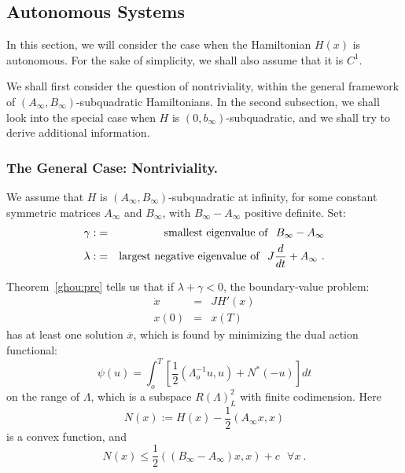 \documentclass{llncs}
\begin{document}
    \subsection{Autonomous Systems}
    In this section, we will consider the case when the Hamiltonian $H(x)$
    is autonomous. For the sake of simplicity, we shall also assume that it
    is $C^{1}$.
    
    We shall first consider the question of nontriviality, within the
    general framework of
    $\left(A_{\infty},B_{\infty}\right)$-subquadratic Hamiltonians. In
    the second subsection, we shall look into the special case when $H$ is
    $\left(0,b_{\infty}\right)$-subquadratic,
    and we shall try to derive additional information.
    \subsubsection{The General Case: Nontriviality.}
    We assume that $H$ is
    $\left(A_{\infty},B_{\infty}\right)$-sub\-qua\-dra\-tic at infinity,
    for some constant symmetric matrices $A_{\infty}$ and $B_{\infty}$,
    with $B_{\infty}-A_{\infty}$ positive definite. Set:
    \begin{eqnarray}
    \gamma :&=&{\rm smallest\ eigenvalue\ of}\ \ B_{\infty} - A_{\infty} \\
      \lambda : &=& {\rm largest\ negative\ eigenvalue\ of}\ \
      J \frac{d}{dt} +A_{\infty}\ .
    \end{eqnarray}
    
    Theorem~\ref{ghou:pre} tells us that if $\lambda +\gamma < 0$, the
    boundary-value problem:
    \begin{equation}
    \begin{array}{rcl}
      \dot{x}&=&JH' (x)\\
      x(0)&=&x (T)
    \end{array}
    \end{equation}
    has at least one solution
    $\overline{x}$, which is found by minimizing the dual
    action functional:
    \begin{equation}
      \psi (u) = \int_{o}^{T} \left[\frac{1}{2}
      \left(\Lambda_{o}^{-1} u,u\right) + N^{\ast} (-u)\right] dt
    \end{equation}
    on the range of $\Lambda$, which is a subspace $R (\Lambda)_{L}^{2}$
    with finite codimension. Here
    \begin{equation}
      N(x) := H(x) - \frac{1}{2} \left(A_{\infty} x,x\right)
    \end{equation}
    is a convex function, and
    \begin{equation}
      N(x) \le \frac{1}{2}
      \left(\left(B_{\infty} - A_{\infty}\right) x,x\right)
      + c\ \ \ \forall x\ .
    \end{equation}
    
\end{document}
